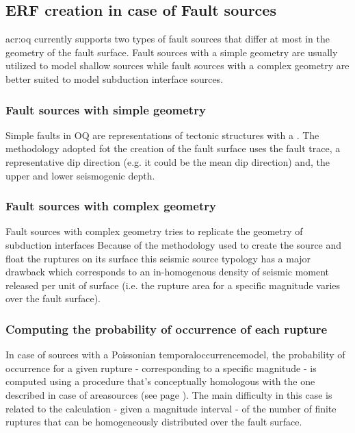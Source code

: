 \subsection{ERF creation in case of Fault sources}
\gls{acr:oq} currently supports two types of fault sources that 
differ at most in the geometry of the fault surface. 
%
Fault sources with a simple geometry are usually utilized to model 
shallow sources while fault sources with a complex geometry are 
better suited to model subduction interface sources.
%
\subsubsection{Fault sources with simple geometry}
Simple faults in OQ are representations of tectonic structures with a . 
The methodology adopted fot the creation of the fault surface uses the 
fault trace, a representative dip direction (e.g. it could be the mean 
dip direction) and, the upper and lower seismogenic depth. 
%
\subsubsection{Fault sources with complex geometry}
Fault sources with complex geometry tries to replicate the geometry of
subduction interfaces 
Because of the methodology used to create the source and float the 
ruptures on its surface this seismic source typology has a major 
drawback which corresponds to an in-homogenous density of seismic 
moment released per unit of surface (i.e. the rupture area for a specific
magnitude varies over the fault surface).
%
\subsubsection{Computing the probability of occurrence of each rupture}
In case of sources with a Poissonian \gls{temporaloccurrencemodel}, the 
probability of occurrence for a given rupture - corresponding to 
a specific magnitude - is computed using a procedure that's conceptually 
homologous with the one described in case of \glspl{areasource} (see
page \pageref{par:erf_calc_area_src}). 
The main difficulty in this case is related to the calculation - given a 
magnitude interval - of the number of finite ruptures that can be 
homogeneously distributed over the fault surface.
%
%

